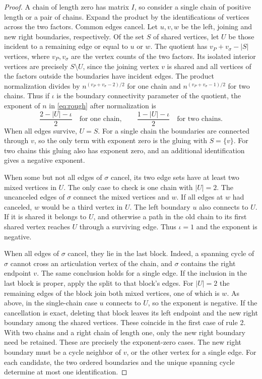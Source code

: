 \documentclass[preprints,article,submit,oneauthor]{Definitions/mdpi}
\newcommand{\abs}[1]{\lvert #1\rvert}
\begin{document}
\begin{proof}
A chain of length zero has matrix \(I\), so consider a single chain
of positive length or a pair of chains. Expand the product by the
identifications of vertices across the two factors. Common edges
cancel. Let \(u,v,w\) be the left, joining and new right boundaries,
respectively. Of the set \(S\) of shared vertices, let \(U\) be those
incident to a remaining edge or equal to \(u\) or \(w\). The quotient
has \(v_P+v_\sigma-\abs S\) vertices, where \(v_P,v_\sigma\) are the
vertex counts of the two factors. Its isolated interior vertices
are precisely \(S\setminus U\), since the joining vertex \(v\) is
shared and all vertices of the factors outside the boundaries
have incident edges. The product normalization divides by
\(n^{(v_P+v_\sigma-2)/2}\) for one chain and
\(n^{(v_P+v_\sigma-1)/2}\) for two chains. Thus if \(\iota\) is the
boundary connectivity parameter of the quotient, the exponent of
\(n\) in \eqref{eq:rough} after normalization is
\[
 \frac{2-\abs U-\iota}{2}\quad\text{for one chain},\qquad
 \frac{1-\abs U-\iota}{2}\quad\text{for two chains}.
\]
When all edges survive, \(U=S\). For a single chain the boundaries
are connected through \(v\), so the only term with exponent zero is
the gluing with \(S=\{v\}\). For two chains this gluing also has
exponent zero, and an additional identification gives a negative
exponent.

When some but not all edges of \(\sigma\) cancel, its two edge sets
have at least two mixed vertices in \(U\). The only case to check is
one chain with \(\abs U=2\). The uncanceled edges of \(\sigma\) connect
the mixed vertices and \(w\). If all edges at \(w\) had canceled,
\(w\) would be a third vertex in \(U\). The left boundary \(u\) also
connects to \(U\). If it
is shared it belongs to \(U\), and otherwise a path in the old chain
to its first shared vertex reaches \(U\) through a surviving edge.
Thus \(\iota=1\) and the exponent is negative.

When all edges of \(\sigma\) cancel, they lie in the last block. Indeed,
a spanning cycle of \(\sigma\) cannot cross an articulation vertex of
the chain, and \(\sigma\) contains the right endpoint \(v\). The same
conclusion holds for a single edge. If the inclusion in the last block
is proper, apply the split to that block's edges. For \(\abs U=2\) the
remaining edges of the block join both mixed vertices, one of which is
\(w\). As above, in the single-chain case \(u\) connects to \(U\), so the
exponent is negative. If the cancellation is exact, deleting that
block leaves its left endpoint and the new right boundary among the
shared vertices. These coincide in the first case of rule 2. With two
chains and a right chain of length one, only the new right boundary
need be retained. These are precisely the exponent-zero cases.
The new right boundary must be a cycle neighbor of \(v\), or the
other vertex for a single edge. For each candidate, the two ordered
boundaries and the unique spanning cycle determine at most one
identification.


\end{proof}
\end{document}
